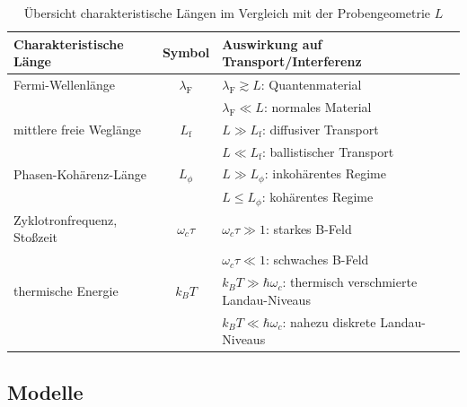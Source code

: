 \documentclass{article}
\begin{document}
\begin{table}[h]
	\centering
	\caption{Übersicht charakteristische Längen im Vergleich mit der Probengeometrie $L$}
	\begin{tabular}{l|c|l}
		\hline\hline
			Charakteristische Länge & Symbol & Auswirkung auf Transport/Interferenz \\
		\hline
			Fermi-Wellenlänge & $\lambda_\text{F}$ & $\lambda_\text{F} \gtrsim L$: Quantenmaterial \\
			& & $\lambda_\text{F} \ll L$: normales Material \\
		\hline
			mittlere freie Weglänge & $L_\text{f}$ & $L \gg L_\text{f}$: diffusiver Transport \\
			& & $L \ll L_\text{f}$: ballistischer Transport \\
		\hline
			Phasen-Kohärenz-Länge & $L_\phi$ & $L \gg L_\phi$: inkohärentes Regime \\
			& & $L \leq L_\phi$: kohärentes Regime \\
		\hline
			Zyklotronfrequenz, Stoßzeit & $\omega_c \tau$ & $\omega_c \tau \gg 1$: starkes B-Feld \\
			&  & $\omega_c \tau \ll 1$: schwaches B-Feld \\
		\hline
			thermische Energie & $k_B T$ & $k_B T \gg \hbar \omega_c$: thermisch verschmierte Landau-Niveaus \\
			&  & $k_B T \ll \hbar \omega_c$: nahezu diskrete Landau-Niveaus \\
		\hline\hline
	\end{tabular}
\end{table}


\newpage


\subsection{Modelle}
\end{document}
